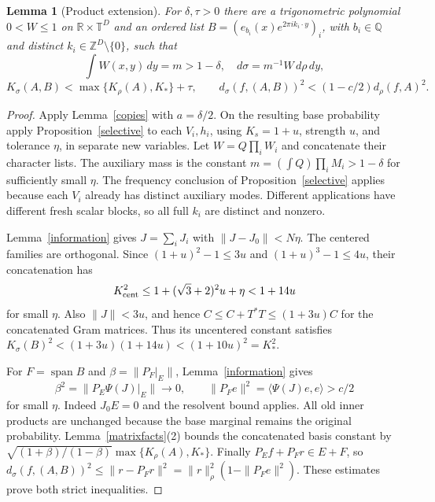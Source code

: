 \documentclass[reqno,a4paper,12pt]{amsart}
\newtheorem{lemma}[theorem]{Lemma}
\newcommand{\R}{\mathbb R}
\newcommand{\T}{\mathbb T}
\newcommand{\Q}{\mathbb Q}
\newcommand{\Z}{\mathbb Z}
\newcommand{\spn}{\operatorname{span}}
\newcommand{\ip}[2]{\langle #1,#2\rangle}
\begin{document}
\begin{lemma}[Product extension]\label{product}
For $\delta,\tau>0$ there are a trigonometric polynomial $0<W\le1$
on $\R\times\T^D$ and an ordered list
$B=(e_{b_i}(x)e^{2\pi ik_i\cdot y})_i$, with $b_i\in\Q$ and distinct
$k_i\in\Z^D\setminus\{0\}$, such that
\[
 \int W(x,y)\,dy=m>1-\delta,\quad d\sigma=m^{-1}W\,d\rho\,dy,
\]
\[
 K_\sigma(A,B)<\max\{K_\rho(A),K_*\}+\tau,\qquad
 d_\sigma(f,(A,B))^2<(1-c/2)d_\rho(f,A)^2.
\]
\end{lemma}
\begin{proof}
Apply Lemma~\ref{copies} with $a=\delta/2$. On the resulting base
probability apply Proposition~\ref{selective} to each $V_i,h_i$, using
$K_s=1+u$, strength $u$, and tolerance $\eta$, in separate new variables.
Let $W=Q\prod_iW_i$ and concatenate their character lists.
The auxiliary mass is the constant $m=(\int Q)\prod_iM_i>1-\delta$
for sufficiently small $\eta$. The frequency conclusion of
Proposition~\ref{selective} applies because each $V_i$ already has
distinct auxiliary modes. Different applications have different fresh
scalar blocks, so all full $k_i$ are distinct and nonzero.

Lemma~\ref{information} gives $J=\sum_iJ_i$ with
$\|J-J_0\|<N\eta$. The centered families are orthogonal. Since
$(1+u)^2-1\le3u$ and $(1+u)^3-1\le4u$, their concatenation has
\[
 K_{\rm cent}^2\le1+(\sqrt3+2)^2u+\eta<1+14u
\]
for small $\eta$. Also $\|J\|<3u$, and hence
$C\le C+T^*T\le(1+3u)C$ for the concatenated Gram matrices.
Thus its uncentered constant satisfies
$K_\sigma(B)^2<(1+3u)(1+14u)<(1+10u)^2=K_*^2$.

For $F=\spn B$ and $\beta=\|P_F|_E\|$,
Lemma~\ref{information} gives
\[
 \beta^2=\|P_E\Psi(J)|_E\|\longrightarrow0,\qquad
 \|P_Fe\|^2=\ip{\Psi(J)e}{e}>c/2
\]
for small $\eta$. Indeed $J_0E=0$ and the resolvent bound applies.
All old inner products are unchanged because the base marginal remains
the original probability. Lemma~\ref{matrixfacts}(2) bounds the
concatenated basis constant by
$\sqrt{(1+\beta)/(1-\beta)}\max\{K_\rho(A),K_*\}$.
Finally $P_Ef+P_Fr\in E+F$, so
$d_\sigma(f,(A,B))^2\le\|r-P_Fr\|^2
=\|r\|_\rho^2(1-\|P_Fe\|^2)$.
These estimates prove both strict inequalities.
\end{proof}
\end{document}
